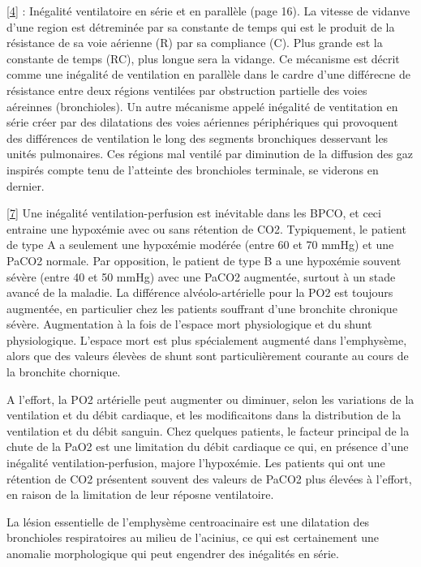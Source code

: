 \documentclass[12pt,]{article}
\begin{document}
{[}\protect\hyperlink{ref-west1988physiopathologie}{4}{]} : Inégalité
ventilatoire en série et en parallèle (page 16). La vitesse de vidanve
d'une region est détreminée par sa constante de temps qui est le produit
de la résistance de sa voie aérienne (R) par sa compliance (C). Plus
grande est la constante de temps (RC), plus longue sera la vidange. Ce
mécanisme est décrit comme une inégalité de ventilation en parallèle
dans le cardre d'une différecne de résistance entre deux régions
ventilées par obstruction partielle des voies aéreinnes (bronchioles).
Un autre mécanisme appelé inégalité de ventitation en série créer par
des dilatations des voies aériennes périphériques qui provoquent des
différences de ventilation le long des segments bronchiques desservant
les unités pulmonaires. Ces régions mal ventilé par diminution de la
diffusion des gaz inspirés compte tenu de l'atteinte des bronchioles
terminale, se viderons en dernier.

{[}\protect\hyperlink{ref-wagner1977ventilation}{7}{]} Une inégalité
ventilation-perfusion est inévitable dans les BPCO, et ceci entraine une
hypoxémie avec ou sans rétention de CO2. Typiquement, le patient de type
A a seulement une hypoxémie modérée (entre 60 et 70 mmHg) et une PaCO2
normale. Par opposition, le patient de type B a une hypoxémie souvent
sévère (entre 40 et 50 mmHg) avec une PaCO2 augmentée, surtout à un
stade avancé de la maladie. La différence alvéolo-artérielle pour la PO2
est toujours augmentée, en particulier chez les patients souffrant d'une
bronchite chronique sévère. Augmentation à la fois de l'espace mort
physiologique et du shunt physiologique. L'espace mort est plus
spécialement augmenté dans l'emphysème, alors que des valeurs élevèes de
shunt sont particulièrement courante au cours de la bronchite chornique.

A l'effort, la PO2 artérielle peut augmenter ou diminuer, selon les
variations de la ventilation et du débit cardiaque, et les modificaitons
dans la distribution de la ventilation et du débit sanguin. Chez
quelques patients, le facteur principal de la chute de la PaO2 est une
limitation du débit cardiaque ce qui, en présence d'une inégalité
ventilation-perfusion, majore l'hypoxémie. Les patients qui ont une
rétention de CO2 présentent souvent des valeurs de PaCO2 plus élevées à
l'effort, en raison de la limitation de leur réposne ventilatoire.

La lésion essentielle de l'emphysème centroacinaire est une dilatation
des bronchioles respiratoires au milieu de l'acinius, ce qui est
certainement une anomalie morphologique qui peut engendrer des
inégalités en série.
\end{document}
